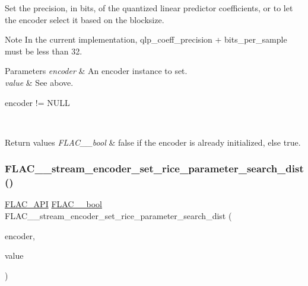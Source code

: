 Set the precision, in bits, of the quantized linear predictor coefficients, or {} to let the encoder select it based on the blocksize.

\begin{DoxyNote}{Note}
In the current implementation, qlp\+\_\+coeff\+\_\+precision + bits\+\_\+per\+\_\+sample must be less than 32.
\end{DoxyNote}
{} 
\begin{DoxyParams}{Parameters}
{\em encoder} & An encoder instance to set. \\
\hline
{\em value} & See above.  
\begin{DoxyCode}
encoder != NULL 
\end{DoxyCode}
 \\
\hline
\end{DoxyParams}

\begin{DoxyRetVals}{Return values}
{\em F\+L\+A\+C\+\_\+\+\_\+bool} & {\ttfamily false} if the encoder is already initialized, else {\ttfamily true}. \\
\hline
\end{DoxyRetVals}
\mbox{\label{group__flac__stream__encoder_ga668de93e7061bce21475c062ffab3e18}} 
\subsubsection{\texorpdfstring{F\+L\+A\+C\+\_\+\+\_\+stream\+\_\+encoder\+\_\+set\+\_\+rice\+\_\+parameter\+\_\+search\+\_\+dist()}{FLAC\_\_stream\_encoder\_set\_rice\_parameter\_search\_dist()}}
{\footnotesize\ttfamily \hyperlink{group__flac__export_ga56ca07df8a23310707732b1c0007d6f5}{F\+L\+A\+C\+\_\+\+A\+PI} \hyperlink{ordinals_8h_a95103469f1cbd78b8cf250194985b34e}{F\+L\+A\+C\+\_\+\+\_\+bool} F\+L\+A\+C\+\_\+\+\_\+stream\+\_\+encoder\+\_\+set\+\_\+rice\+\_\+parameter\+\_\+search\+\_\+dist (\begin{DoxyParamCaption}\item[{\hyperlink{struct_f_l_a_c_____stream_encoder}{F\+L\+A\+C\+\_\+\+\_\+\+Stream\+Encoder} $\ast$}]{encoder,  }\item[{unsigned}]{value }\end{DoxyParamCaption})}

